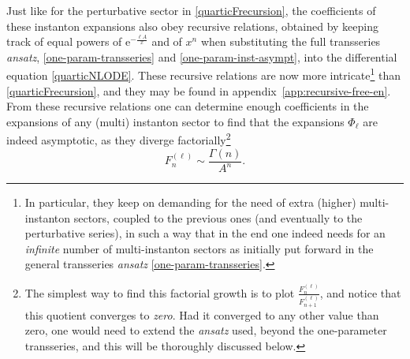 \documentclass[11pt,a4paper]{article}
\newcommand{\be}{\begin{equation}}
\newcommand{\ee}{\end{equation}}
\newcommand{\rme}{{\mathrm{e}}}
\begin{document}
Just like for the perturbative sector in \eqref{quarticFrecursion}, the coefficients of these instanton expansions also obey recursive relations, obtained by keeping track of equal powers of $\rme^{-\frac{\ell A}{x}}$ and of $x^n$ when substituting the full transseries \textit{ansatz}, \eqref{one-param-transseries} and \eqref{one-param-inst-asympt}, into the differential equation \eqref{quarticNLODE}. These recursive relations are now more intricate\footnote{In particular, they keep on demanding for the need of extra (higher) multi-instanton sectors, coupled to the previous ones (and eventually to the perturbative series), in such a way that in the end one indeed needs for an \textit{infinite} number of multi-instanton sectors as initially put forward in the general transseries \textit{ansatz} \eqref{one-param-transseries}.} than \eqref{quarticFrecursion}, and they may be found in appendix~\ref{app:recursive-free-en}. From these recursive relations one can determine enough coefficients in the expansions of any (multi) instanton sector to find that the expansions $\Phi_{\ell}$ are indeed asymptotic, as they diverge factorially\footnote{The simplest way to find this factorial growth is to plot $\frac{F_{n}^{(\ell)}}{F_{n+1}^{(\ell)}}$, and notice that this quotient converges to \textit{zero}. Had it converged to any other value than zero, one would need to extend the \textit{ansatz} used, beyond the one-parameter transseries, and this will be thoroughly discussed below.}
%
\be
\label{quarticmultiFdivergesn!}
F_n^{(\ell)} \sim \frac{\Gamma(n)}{A^n}.
\ee
\end{document}
